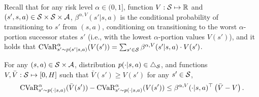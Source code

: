 Recall that for any risk level $\alpha \in (0,1]$, function $V: \mathcal{S} \mapsto \mathbb{R}$ and $(s',s,a) \in \mathcal{S} \times \mathcal{S} \times \mathcal{A}$, $\beta^{\alpha,V}(s'|s,a)$ is the conditional probability of transitioning to $s'$ from $(s,a)$, conditioning on transitioning to the worst $\alpha$-portion successor states $s'$ (i.e., with the lowest $\alpha$-portion values $V(s')$), and it holds that $\textup{CVaR}^{\alpha}_{s'\sim p(s'|s,a)}(V(s'))=\sum_{s' \in \mathcal{S}} \beta^{\alpha,V}(s'|s,a) \cdot V(s')$. 

\begin{lemma} \label{lemma:cvar_increase_V}
	For any $(s,a) \in \mathcal{S} \times \mathcal{A}$, distribution $p(\cdot|s,a) \in \triangle_{\mathcal{S}}$, and functions $V,\bar{V}:\mathcal{S} \mapsto [0,H]$ such that $\bar{V}(s') \geq V(s')$ for any $s' \in \mathcal{S}$,
	\begin{align*}
		\textup{CVaR}^{\alpha}_{s' \sim p(\cdot|s,a)}(\bar{V}(s')) - \textup{CVaR}^{\alpha}_{s' \sim p(\cdot|s,a)}(V(s')) \leq \beta^{\alpha,V}(\cdot|s,a)^\top \left( \bar{V}-V \right) .
	\end{align*}
\end{lemma}
